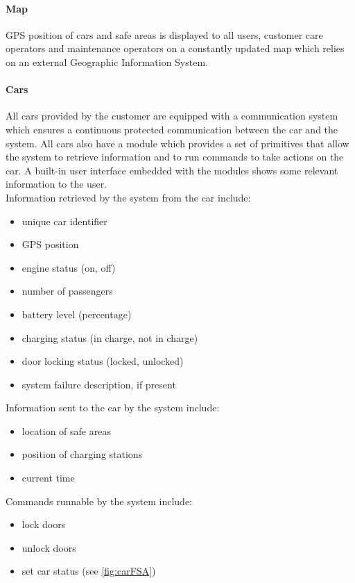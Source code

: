 	\paragraph{Map} GPS position of cars and safe areas is displayed to all users, customer care operators and maintenance operators on a constantly updated map which relies on an external Geographic Information System.

	\paragraph{Cars}\label{sec:cars}All cars provided by the customer are equipped with a communication system which ensures a continuous protected communication between the car and the system. All cars also have a module which provides a set of primitives that allow the system to retrieve information and to run commands to take actions on the car. A built-in user interface embedded with the modules shows some relevant information to the user.\\
	Information retrieved by the system from the car include:
	\begin{itemize}
		\item unique car identifier
		\item GPS position
		\item engine status (on, off)
		\item number of passengers
		\item battery level (percentage)
		\item charging status (in charge, not in charge)
		\item door locking status (locked, unlocked)
		\item system failure description, if present
	\end{itemize}
	Information sent to the car by the system include:
	\begin{itemize}
		\item location of safe areas 
		\item position of charging stations 
		\item current time
	\end{itemize}
	Commands runnable by the system include:
	\begin{itemize}
		\item lock doors 
		\item unlock doors
		\item set car status (see \autoref{fig:carFSA})
	
	\end{itemize}		
